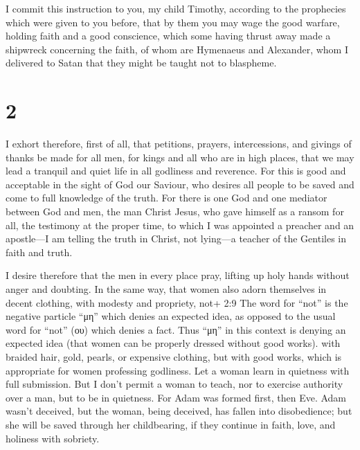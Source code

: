  I commit this instruction to you, my child Timothy,
according to the prophecies which were given to you before, that by them
you may wage the good warfare,  holding faith and a good
conscience, which some having thrust away made a shipwreck concerning
the faith,  of whom are Hymenaeus and Alexander, whom I
delivered to Satan that they might be taught not to blaspheme.

\hypertarget{section-1}{%
\section{2}\label{section-1}}

 I exhort therefore, first of all, that petitions, prayers,
intercessions, and givings of thanks be made for all men, 
for kings and all who are in high places, that we may lead a tranquil
and quiet life in all godliness and reverence.  For this is
good and acceptable in the sight of God our Saviour,  who
desires all people to be saved and come to full knowledge of the truth.
 For there is one God and one mediator between God and men,
the man Christ Jesus,  who gave himself as a ransom for all,
the testimony at the proper time,  to which I was appointed
a preacher and an apostle---I am telling the truth in Christ, not
lying---a teacher of the Gentiles in faith and truth.

 I desire therefore that the men in every place pray,
lifting up holy hands without anger and doubting.  In the
same way, that women also adorn themselves in decent clothing, with
modesty and propriety, not+ 2:9 The word for ``not'' is the negative
particle ``μη'' which denies an expected idea, as opposed to the usual
word for ``not'' (ου) which denies a fact. Thus ``μη'' in this context
is denying an expected idea (that women can be properly dressed without
good works). with braided hair, gold, pearls, or expensive clothing,
 but with good works, which is appropriate for women
professing godliness.  Let a woman learn in quietness with
full submission.  But I don't permit a woman to teach, nor
to exercise authority over a man, but to be in quietness. 
For Adam was formed first, then Eve.  Adam wasn't deceived,
but the woman, being deceived, has fallen into disobedience;
 but she will be saved through her childbearing, if they
continue in faith, love, and holiness with sobriety.

